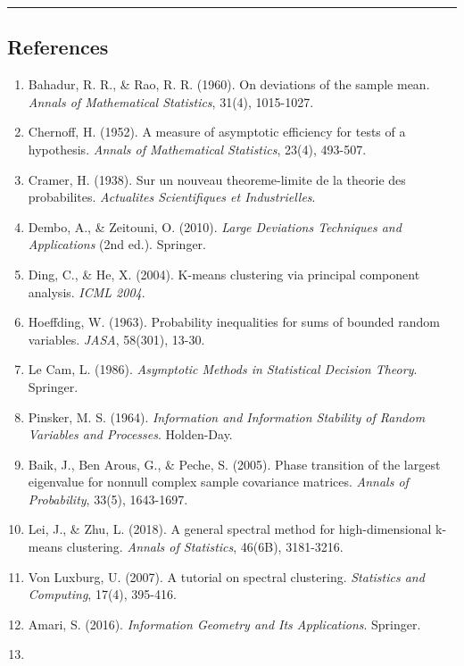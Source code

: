 \documentclass[
  12pt,
]{ctexart}
\providecommand{\tightlist}{%
  \setlength{\itemsep}{0pt}\setlength{\parskip}{0pt}}
\begin{document}
\begin{center}\rule{0.5\linewidth}{0.5pt}\end{center}

\subsection{References}\label{references}

\begin{enumerate}
\def\labelenumi{\arabic{enumi}.}
\tightlist
\item
  Bahadur, R. R., \& Rao, R. R. (1960). On deviations of the sample
  mean. \emph{Annals of Mathematical Statistics}, 31(4), 1015-1027.
\item
  Chernoff, H. (1952). A measure of asymptotic efficiency for tests of a
  hypothesis. \emph{Annals of Mathematical Statistics}, 23(4), 493-507.
\item
  Cramer, H. (1938). Sur un nouveau theoreme-limite de la theorie des
  probabilites. \emph{Actualites Scientifiques et Industrielles}.
\item
  Dembo, A., \& Zeitouni, O. (2010). \emph{Large Deviations Techniques
  and Applications} (2nd ed.). Springer.
\item
  Ding, C., \& He, X. (2004). K-means clustering via principal component
  analysis. \emph{ICML 2004}.
\item
  Hoeffding, W. (1963). Probability inequalities for sums of bounded
  random variables. \emph{JASA}, 58(301), 13-30.
\item
  Le Cam, L. (1986). \emph{Asymptotic Methods in Statistical Decision
  Theory}. Springer.
\item
  Pinsker, M. S. (1964). \emph{Information and Information Stability of
  Random Variables and Processes}. Holden-Day.
\item
  Baik, J., Ben Arous, G., \& Peche, S. (2005). Phase transition of the
  largest eigenvalue for nonnull complex sample covariance matrices.
  \emph{Annals of Probability}, 33(5), 1643-1697.
\item
  Lei, J., \& Zhu, L. (2018). A general spectral method for
  high-dimensional k-means clustering. \emph{Annals of Statistics},
  46(6B), 3181-3216.
\item
  Von Luxburg, U. (2007). A tutorial on spectral clustering.
  \emph{Statistics and Computing}, 17(4), 395-416.
\item
  Amari, S. (2016). \emph{Information Geometry and Its Applications}.
  Springer.
\item

\end{enumerate}
\end{document}
